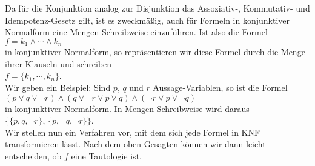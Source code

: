 Da f\"{u}r die Konjunktion analog zur Disjunktion das Assoziativ-, Kommutativ- und Idempotenz-Gesetz gilt, ist es zweckm\"{a}\ss{}ig, auch f\"{u}r Formeln in konjunktiver Normalform eine Mengen-Schreibweise einzuf\"{u}hren.
Ist also die Formel
\\[0.2cm]
\hspace*{1.3cm} $f = k_1 \wedge \cdots \wedge k_n$
\\[0.2cm]
in konjunktiver Normalform, so repr\"{a}sentieren wir diese
Formel  durch die Menge ihrer Klauseln und schreiben \\[0.2cm]
\hspace*{1.3cm} $f = \{ k_1, \cdots, k_n \}$. 
\\[0.2cm]
Wir geben ein Beispiel:  Sind $p$, $q$ und $r$ Aussage-Variablen, so ist die Formel
\\[0.2cm]
\hspace*{1.3cm}
$(p \vee q \vee \neg r) \wedge (q \vee \neg r \vee p \vee q)\wedge (\neg r \vee p \vee \neg q)$
\\[0.2cm]
in konjunktiver Normalform.  In Mengen-Schreibweise wird daraus
\\[0.2cm]
\hspace*{1.3cm}
$\bigl\{ \{p, q, \neg r \},\, \{ p, \neg q, \neg r \} \bigr\}$.
\\[0.2cm]
Wir stellen nun ein Verfahren vor, mit dem sich jede Formel in KNF transformieren l\"{a}sst.  Nach
dem oben Gesagten k\"{o}nnen wir dann leicht entscheiden, ob $f$ eine Tautologie ist.
